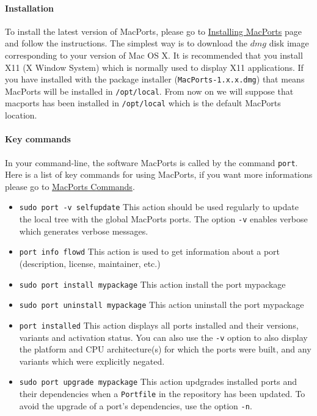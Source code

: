 \documentclass[a4paper]{book}
\begin{document}
\paragraph{Installation}
To install the latest version of MacPorts, please go to \href{http://www.macports.org/install.php}{Installing MacPorts} page and follow the instructions. The simplest way is to download the $dmg$ disk image corresponding to your version of Mac OS X. It is recommended that you install X11 (X Window System) which is normally used to display X11 applications.%
\newline \newline
If you have installed with the package installer (\verb|MacPorts-1.x.x.dmg|) that means MacPorts will be installed in \verb|/opt/local|. From now on we will suppose that macports has been installed in \verb|/opt/local| which is the default MacPorts location. %

\paragraph{Key commands}
In your command-line, the software MacPorts is called by the command \verb|port|. 
Here is a list of key commands for using MacPorts, if you want more informations please go to \href{http://guide.macports.org/#using.port}{MacPorts Commands}.
\begin{itemize}
\item \verb|sudo port -v selfupdate| \newline
	This action should be used regularly to update the local tree with the global MacPorts ports. The option \verb|-v| enables verbose which generates verbose messages.
\item \verb|port info flowd| \newline
	This action is used to get information about a port (description, license, maintainer, etc.)
\item \verb|sudo port install mypackage| \newline
	This action install the port mypackage
\item \verb|sudo port uninstall mypackage| \newline
	This action uninstall the port mypackage
\item \verb|port installed| \newline
	This action displays all ports installed and their versions, variants and activation status. You can also use the \verb|-v| option to also display the platform and CPU architecture(s) for which the ports were built, and any variants which were explicitly negated.
\item \verb|sudo port upgrade mypackage| \newline
	This action updgrades installed ports and their dependencies when a \verb|Portfile| in the repository has been updated. To avoid the upgrade of a port's dependencies, use the option \verb|-n|.
\end{itemize}
\end{document}
